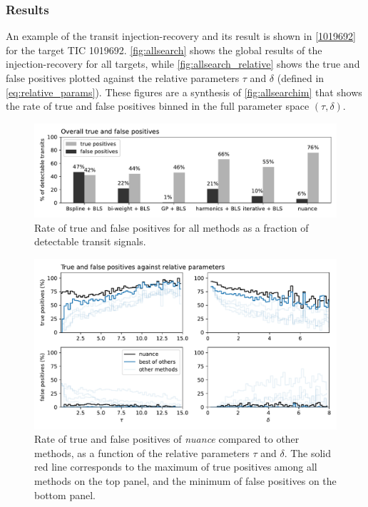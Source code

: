 \documentclass[modern]{aastex631}
\newcommand{\nuancemethod}{\textit{nuance}}
\newcommand{\nuance}{\nuancemethod{}}
\begin{document}
\subsubsection*{Results}
An example of the transit injection-recovery and its result is shown in \autoref{1019692} for the target TIC 1019692. \autoref{fig:allsearch} shows the global results of the injection-recovery for all targets, while \autoref{fig:allsearch_relative} shows the true and false positives plotted against the relative parameters $\tau$ and $\delta$ (defined in \autoref{eq:relative_params}). These figures are a synthesis of \autoref{fig:allsearchim} that shows the rate of true and false positives binned in the full parameter space $(\tau, \delta)$.
\begin{figure}[H]
    \begin{centering}
        \includegraphics[width=\linewidth]{../workflows/tess_injection_recovery/figures/tpfp_bars.pdf}
        \caption{Rate of true and false positives for all methods as a fraction of detectable transit signals.}
        \label{fig:allsearch}
    \end{centering}
\end{figure}
\begin{figure}[H]
    \begin{centering}
        \includegraphics[width=\linewidth]{../workflows/tess_injection_recovery/figures/tpfp.pdf}
        \caption{Rate of true and false positives of \nuance{} compared to other methods, as a function of the relative parameters $\tau$ and $\delta$. The solid red line corresponds to the maximum of true positives among all methods on the top panel, and the minimum of false positives on the bottom panel.}
        \label{fig:allsearch_relative}
    \end{centering}
\end{figure}
\end{document}
